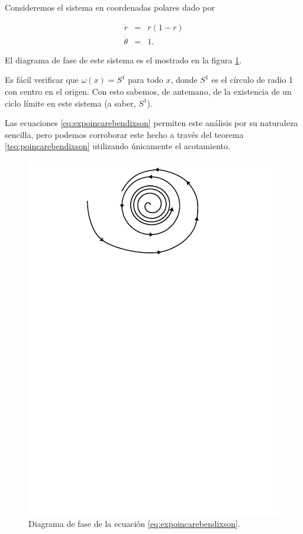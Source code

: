 \begin{example} \label{ex:poincarebendixson}
Consideremos el sistema en coordenadas polares dado por

\begin{equation} \label{eq:expoincarebendixson}
	\begin{array}{lll}
		\dot{r} & = & r(1-r) \\
		\dot{\theta} & = & 1.
	\end{array}
\end{equation}

El diagrama de fase de este sistema es el mostrado en la figura \ref{fig:expoincarebendixson}.

Es fácil verificar que $\omega(x) = S^1$ para todo $x$, donde $S^1$ es el círculo de radio 1 con centro en el origen. Con esto sabemos, de antemano, de la existencia de un ciclo límite en este sistema (a saber, $S^1$).

Las ecuaciones \ref{eq:expoincarebendixson} permiten este análisis por su naturaleza sencilla, pero podemos corroborar este hecho a través del teorema \ref{teo:poincarebendixson} utilizando únicamente el acotamiento.

\begin{figure}[!htb] \centering
	\includegraphics[scale=1.1]{figures/expoincarebendixson.pdf}
	\caption{Diagrama de fase de la ecuación \ref{eq:expoincarebendixson}.}
	\label{fig:expoincarebendixson}
\end{figure}


\end{example}
